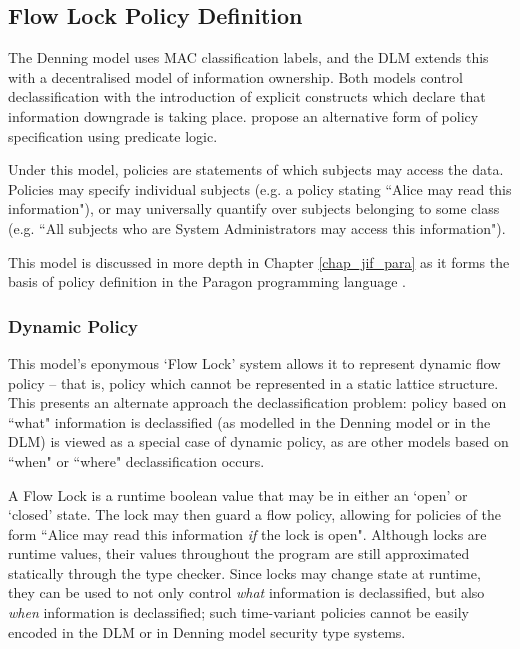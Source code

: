 \subsection{Flow Lock Policy Definition}

The Denning model uses MAC classification labels, and the DLM extends this with a decentralised model of information ownership. Both models control declassification with the introduction of explicit constructs which declare that information downgrade is taking place. \citeauthor{broberg2006flow} \cite{broberg2006flow} propose an alternative form of policy specification using predicate logic.

Under this model, policies are statements of which subjects may access the data. Policies may specify individual subjects (e.g. a policy stating ``Alice may read this information"), or may universally quantify over subjects belonging to some class (e.g. ``All subjects who are System Administrators may access this information").

This model is discussed in more depth in Chapter \ref{chap_jif_para} as it forms the basis of policy definition in the Paragon programming language \cite{broberg2013paragon}.

\subsubsection{Dynamic Policy}

This model's eponymous `Flow Lock' system allows it to represent dynamic flow policy -- that is, policy which cannot be represented in a static lattice structure. This presents an alternate approach the declassification problem:  policy based on ``what" information is declassified (as modelled in the Denning model or in the DLM) is viewed as a special case of dynamic policy, as are other models based on ``when" or ``where" declassification occurs.

A Flow Lock is a runtime boolean value that may be in either an `open' or `closed' state. The lock may then guard a flow policy, allowing for policies of the form ``Alice may read this information \textit{if} the lock  is open". Although locks are runtime values, their values throughout the program are still approximated statically through the type checker. Since locks may change state at runtime, they can be used to not only control \textit{what} information is declassified, but also \textit{when} information is declassified; such time-variant policies cannot be easily encoded in the DLM or in Denning model security type systems.

